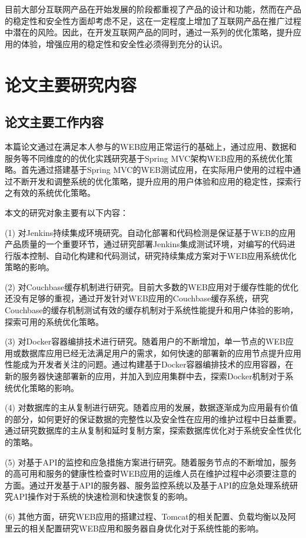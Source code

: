 目前大部分互联网产品在开始发展的阶段都重视了产品的设计和功能，然而在产品的稳定性和安全性方面却考虑不足，这在一定程度上增加了互联网产品在推广过程中潜在的风险。因此，在开发互联网产品的同时，通过一系列的优化策略，提升应用的体验，增强应用的稳定性和安全性必须得到充分的认识。

\section{论文主要研究内容}
\subsection{论文主要工作内容}
本篇论文通过在满足本人参与的WEB应用正常运行的基础上，通过应用、数据和服务等不同维度的的优化实践研究基于Spring MVC架构WEB应用的系统优化策略。首先通过搭建基于Spring MVC的WEB测试应用，在实际用户使用的过程中通过不断开发和调整系统的优化策略，提升应用的用户体验和应用的稳定性，探索行之有效的系统优化策略。

本文的研究对象主要有以下内容：

(1) 对Jenkins持续集成环境研究。自动化部署和代码检测是保证基于WEB的应用产品质量的一个重要环节，通过研究部署Jenkins集成测试环境，对编写的代码进行版本控制、自动化构建和代码测试，研究持续集成方案对于WEB应用系统优化策略的影响。

(2) 对Couchbase缓存机制进行研究。目前大多数的WEB应用对于缓存性能的优化还没有足够的重视，通过开发针对WEB应用的Couchbase缓存系统，研究Couchbase的缓存机制测试有效的缓存机制对于系统性能提升和用户体验的影响，探索可用的系统优化策略。

(3) 对Docker容器编排技术进行研究。随着用户的不断增加，单一节点的WEB应用或数据库应用已经无法满足用户的需求，如何快速的部署新的应用节点提升应用性能成为开发者关注的问题。通过构建基于Docker容器编排技术的应用容器，在新的服务器快速部署新的应用，并加入到应用集群中去，探索Docker机制对于系统优化策略的影响。

(4) 对数据库的主从复制进行研究。随着应用的发展，数据逐渐成为应用最有价值的部分，如何更好的保证数据的完整性以及安全性在应用的维护过程中日益重要。通过研究数据库的主从复制和延时复制方案，探索数据库优化对于系统安全性优化的策略。

(5) 对基于API的监控和应急措施方案进行研究。随着服务节点的不断增加，服务的高可用和服务的健康性检查时WEB应用的运维人员在维护过程中必须要注意的方面。通过开发基于API的服务器、服务监控系统以及基于API的应急处理系统研究API操作对于系统的快速检测和快速恢复的影响。

(6) 其他方面，研究WEB应用的搭建过程、Tomcat的相关配置、负载均衡以及阿里云的相关配置研究WEB应用和服务器自身优化对于系统性能的影响。

